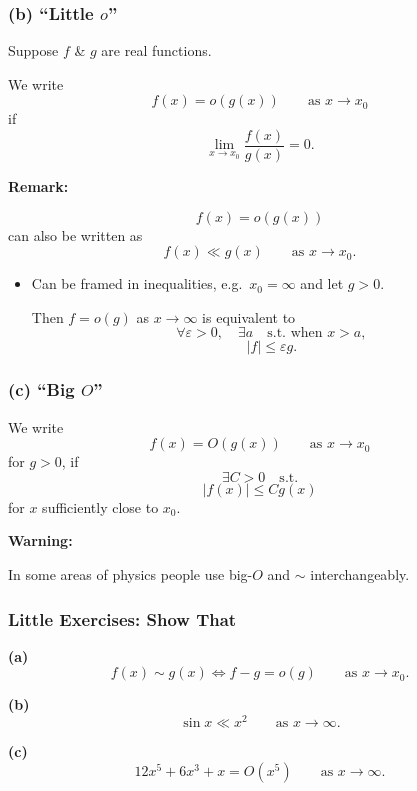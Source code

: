 \documentclass[11pt,a4paper]{article}
\begin{document}
\subsubsection*{(b) ``Little $o$''}

Suppose $f$ \& $g$ are real functions.

We write
\[
\boxed{
f(x)=o(g(x))
\qquad \text{as }x\to x_0
}
\]
if
\[
\boxed{
\lim_{x\to x_0}\frac{f(x)}{g(x)}=0.
}
\]

\noindent\textbf{Remark:}

\[
f(x)=o(g(x))
\]
can also be written as
\[
f(x)\ll g(x)
\qquad \text{as }x\to x_0.
\]

\begin{itemize}
    \item Can be framed in inequalities, e.g.\ $x_0=\infty$ and let $g>0$.

    Then $f=o(g)$ as $x\to\infty$ is equivalent to
    \[
    \forall\varepsilon>0,\quad
    \exists a
    \quad\text{s.t. when }x>a,
    \]
    \[
    \boxed{|f|\leq\varepsilon g.}
    \]
\end{itemize}


\subsubsection*{(c) ``Big $O$''}

We write
\[
f(x)=O(g(x))
\qquad \text{as }x\to x_0
\]
for $g>0$, if
\[
\exists C>0
\quad\text{s.t.}
\]
\[
\boxed{
|f(x)|\leq Cg(x)
}
\]
for $x$ sufficiently close to $x_0$.

\medskip

\noindent\textbf{Warning:}

In some areas of physics people use big-$O$ and $\sim$ interchangeably.


\subsubsection*{Little Exercises: Show That}

\noindent\textbf{(a)}
\[
f(x)\sim g(x)
\iff
f-g=o(g)
\qquad \text{as }x\to x_0.
\]

\medskip

\noindent\textbf{(b)}
\[
\sin x\ll x^2
\qquad \text{as }x\to\infty.
\]

\medskip

\noindent\textbf{(c)}
\[
12x^5+6x^3+x=O(x^5)
\qquad \text{as }x\to\infty.
\]

\medskip
\end{document}
